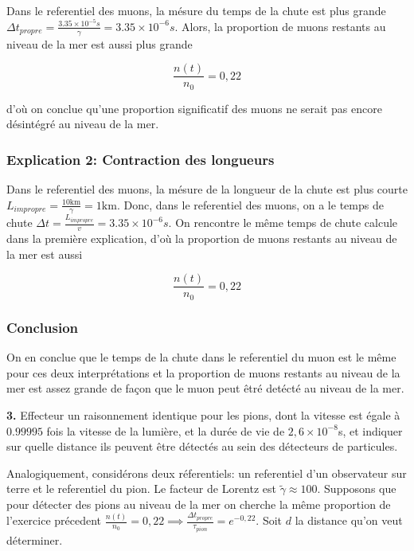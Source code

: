 \documentclass[french]{article}
\begin{document}
	Dans le referentiel des muons, la mésure du temps de la chute est plus grande $\Delta t_{propre} = \frac{3.35 \times 10^{-5}s}{\gamma} = 3.35 \times 10^{-6}s$. Alors, la proportion de muons restants au niveau de la mer est aussi plus grande
	
	$$ \frac{n(t)}{n_0} = 0,22 $$
	
	d'où on conclue qu'une proportion significatif des muons ne serait pas encore désintégré au niveau de la mer.
	
	\subsubsection*{Explication 2: Contraction des longueurs}
	
	Dans le referentiel des muons, la mésure de la longueur de la chute est plus courte $L_{impropre} = \frac{10 \mathrm{km}}{\gamma} = 1 \mathrm{km}$.	Donc, dans le referentiel des muons, on a le temps de chute $\Delta t = \frac{L_{impropre}}{v} = 3.35 \times 10^{-6}s$. On rencontre le même temps de chute calcule dans la première explication, d'où la proportion de muons restants au niveau de la mer est aussi
	
	$$ \frac{n(t)}{n_0} = 0,22 $$
	
	
	\subsubsection*{Conclusion}
	
	On en conclue que le temps de la chute dans le referentiel du muon est le même pour ces deux interprétations et  la proportion de muons restants au niveau de la mer est assez grande de façon que le muon peut êtré detécté au niveau de la mer.

	\begin{tcolorbox}[colback=gray!5!white,colframe=gray!75!black]
		\textbf{3.} Effecteur un raisonnement identique pour les pions, dont la vitesse est égale à $0.99995$ fois la vitesse de la lumière, et la durée de vie de $2,6 \times 10^{-8}$s, et indiquer sur quelle distance ils peuvent être détectés au sein des détecteurs de particules.
	\end{tcolorbox}

	Analogiquement, considérons deux réferentiels: un referentiel d'un observateur sur terre et le referentiel du pion. Le facteur de Lorentz est $\tilde{\gamma} \approx 100$. Supposons que pour détecter des pions au niveau de la mer on cherche la même proportion de l'exercice précedent $\frac{n(t)}{n_0} = 0,22 \implies \frac{\Delta t_{propre}}{\tau_{pion}} = e^{-0,22}$. Soit $d$ la distance qu'on veut déterminer.
	
\end{document}
